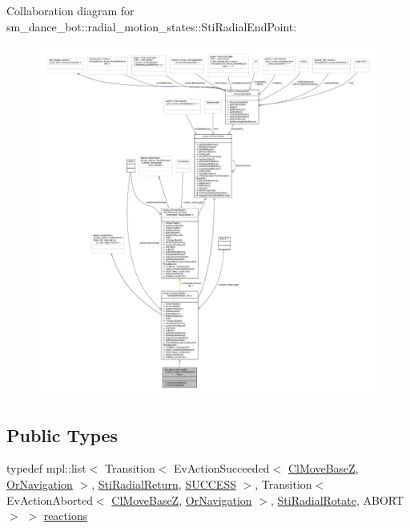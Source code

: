 Collaboration diagram for sm\+\_\+dance\+\_\+bot\+:\+:radial\+\_\+motion\+\_\+states\+:\+:Sti\+Radial\+End\+Point\+:
\nopagebreak
\begin{figure}[H]
\begin{center}
\leavevmode
\includegraphics[width=350pt]{structsm__dance__bot_1_1radial__motion__states_1_1StiRadialEndPoint__coll__graph}
\end{center}
\end{figure}
\subsection*{Public Types}
\begin{DoxyCompactItemize}
\item 
typedef mpl\+::list$<$ Transition$<$ Ev\+Action\+Succeeded$<$ \hyperlink{classmove__base__z__client_1_1ClMoveBaseZ}{Cl\+Move\+BaseZ}, \hyperlink{classsm__dance__bot_1_1OrNavigation}{Or\+Navigation} $>$, \hyperlink{structsm__dance__bot_1_1radial__motion__states_1_1StiRadialReturn}{Sti\+Radial\+Return}, \hyperlink{classSUCCESS}{S\+U\+C\+C\+E\+SS} $>$, Transition$<$ Ev\+Action\+Aborted$<$ \hyperlink{classmove__base__z__client_1_1ClMoveBaseZ}{Cl\+Move\+BaseZ}, \hyperlink{classsm__dance__bot_1_1OrNavigation}{Or\+Navigation} $>$, \hyperlink{structsm__dance__bot_1_1radial__motion__states_1_1StiRadialRotate}{Sti\+Radial\+Rotate}, A\+B\+O\+RT $>$ $>$ \hyperlink{structsm__dance__bot_1_1radial__motion__states_1_1StiRadialEndPoint_aa4d950f02eb10e76a1f6166863d3ee9e}{reactions}
\end{DoxyCompactItemize}
